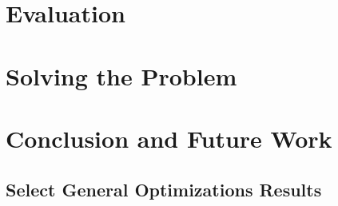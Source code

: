 \documentclass[10pt]{article}
\begin{document}
\section{Evaluation}


\section{Solving the Problem}


\section{Conclusion and Future Work}


\pagebreak




\pagebreak
\begin{appendices}



\section{Select General Optimizations Results}
\label{appendix:general-optimizations-results}
%

\end{appendices}
\end{document}
